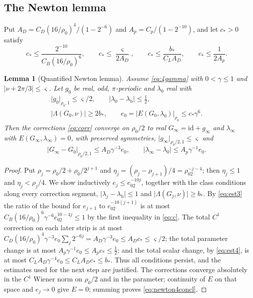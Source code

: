 \documentclass[11pt]{amsart}
\numberwithin{equation}{section}
\newtheorem{lemma}[theorem]{Lemma}
\theoremstyle{definition}
\theoremstyle{remark}
\newcommand{\abs}[1]{\lvert #1\rvert}
\newcommand{\id}{\mathrm{id}}
\newcommand{\lb}{\lambda_{\mathrm b}}
\begin{document}
\subsection{The Newton lemma}
Put $A_D=C_D(16/\rho_0)^4/(1-2^{-6})$ and $A_p=C_p/(1-2^{-10})$, and let $c_*>0$ satisfy
\begin{equation}\label{eq:c}
c_*\le\frac{2^{-10}}{C_B(16/\rho_0)^6},\qquad c_*\le\frac\varsigma{2A_D},\qquad c_*\le\frac {b_*}{C_LA_D},\qquad c_*\le\frac1{2A_p}.
\end{equation}

\begin{lemma}[Quantified Newton lemma]\label{lem:newton4}
Assume \eqref{eq:4gamma} with $0<\gamma\le1$ and $\abs{\nu+2\pi/3}\le\varsigma$. Let $g_0$ be real, odd, $\pi$-periodic and $\lambda_0$ real with
\begin{equation}\label{eq:hyp4}
\begin{gathered}
\abs{g_0}_{\rho_0,1}\le\varsigma/2,\qquad\abs{\lambda_0-\lb}\le\tfrac12,\\
\abs{\Lambda(G_0,\nu)}\ge2b_*,\qquad e_0=\abs{E(G_0,\lambda_0)}_{\rho_0}\le c_*\gamma^6 .
\end{gathered}
\end{equation}
Then the corrections \eqref{eq:corr} converge on $\rho_0/2$ to real $G_\infty=\id+g_\infty$ and $\lambda_\infty$ with $E(G_\infty,\lambda_\infty)=0$, with preserved symmetries, $\abs{g_\infty}_{\rho_0/2,1}\le\varsigma$ and
\begin{equation}\label{eq:newton4concl}
\abs{G_\infty-G_0}_{\rho_0/2,1}\le A_D\gamma^{-3}e_0,\qquad\abs{\lambda_\infty-\lambda_0}\le A_p\gamma^{-1}e_0.
\end{equation}
\end{lemma}

\begin{proof}
Put $\rho_j=\rho_0/2+\rho_0/2^{j+1}$ and $\eta_j=(\rho_j-\rho_{j+1})/4=\rho_02^{-j-4}$; then $\eta_j\le1$ and $\eta_j<\rho_j/4$. We show inductively $e_j\le e_02^{-10j}$, together with the class conditions along every correction segment, $\abs{\lambda_j-\lb}\le1$ and $\abs{\Lambda(G_j,\nu)}\ge b_*$. By \eqref{eq:est3} the ratio of the bound for $e_{j+1}$ to $e_02^{-10(j+1)}$ is at most $C_B(16/\rho_0)^6\gamma^{-6}e_02^{10-4j}\le1$ by the first inequality in \eqref{eq:c}. The total $C^1$ correction on each later strip is at most $C_D(16/\rho_0)^4\gamma^{-3}e_0\sum_j2^{-6j}=A_D\gamma^{-3}e_0\le A_Dc_*\le\varsigma/2$; the total parameter change is at most $A_p\gamma^{-1}e_0\le A_pc_*\le\frac12$; and the total scalar change, by \eqref{eq:est4}, is at most $C_LA_D\gamma^{-4}e_0\le C_LA_Dc_*\le b_*$. Thus all conditions persist, and the estimates used for the next step are justified. The corrections converge absolutely in the $C^1$ Wiener norm on $\rho_0/2$ and in the parameter; continuity of $E$ on that space and $e_j\to0$ give $E=0$; summing proves \eqref{eq:newton4concl}.
\end{proof}
\end{document}
